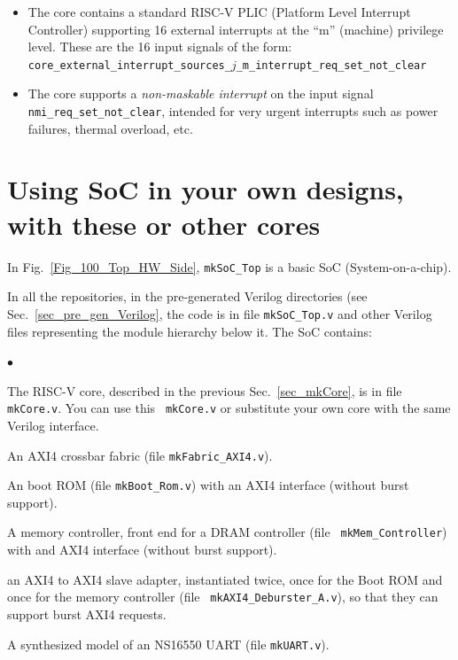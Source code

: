\documentclass[11pt]{book}
\newenvironment{tightlist}%
{\begin{list}{$\bullet$}{%
    \setlength{\topsep}{0in}
    \setlength{\partopsep}{0in}
    \setlength{\itemsep}{0in}
    \setlength{\parsep}{0in}
    \setlength{\leftmargin}{1.5em}
    \setlength{\rightmargin}{0in}
    \setlength{\itemindent}{0in}
}
}%
{\end{list}
}
\newcommand{\cf}{\footnotesize\tt}
\begin{document}
\begin{itemize}
\item The core contains a standard RISC-V PLIC (Platform Level
  Interrupt Controller) supporting 16 external interrupts at the ``m''
  (machine) privilege level.  These are the 16 input signals of the form:
{\cf core\_external\_interrupt\_sources\_$j$\_m\_interrupt\_req\_set\_not\_clear}

\item The core supports a \emph{non-maskable interrupt} on the input
  signal {\cf nmi\_req\_set\_not\_clear}, intended for very urgent
  interrupts such as power failures, thermal overload, etc.

\end{itemize}


\section{Using SoC in your own designs, with these or other cores}

In Fig.~\ref{Fig_100_Top_HW_Side}, {\cf mkSoC\_Top} is a basic SoC
(System-on-a-chip).

In all the repositories, in the pre-generated Verilog directories (see
Sec.~\ref{sec_pre_gen_Verilog}, the code is in file {\cf mkSoC\_Top.v}
and other Verilog files representing the module hierarchy below it.
The SoC contains:

\begin{tightlist}

\item The RISC-V core, described in the previous
Sec.~\ref{sec_mkCore}, is in file {\cf mkCore.v}.  You can use this {\cf
mkCore.v} or substitute your own core with the same Verilog interface.

\item An AXI4 crossbar fabric (file {\cf mkFabric\_AXI4.v}).

\item An boot ROM (file {\cf mkBoot\_Rom.v}) with an AXI4 interface (without burst support).

\item A memory controller, front end for a DRAM controller (file {\cf
mkMem\_Controller}) with and AXI4 interface (without burst support).

\item an AXI4 to AXI4 slave adapter, instantiated twice, once for the
Boot ROM and once for the memory controller (file {\cf
mkAXI4\_Deburster\_A.v}), so that they can support burst AXI4
requests.

\item A synthesized model of an NS16550 UART (file {\cf mkUART.v}).

\end{tightlist}
\end{document}
